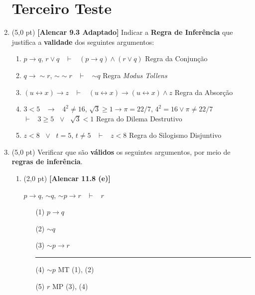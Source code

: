 \documentclass[12pt,a4paper,oneside]{article}
\begin{document}
\begin{enumerate}
	
	\section*{Terceiro Teste}
	
	\item (5,0 pt) {\bf [Alencar 9.3 Adaptado]} Indicar a {\bf Regra de Inferência} que justifica a {\bf validade} dos seguintes argumentos:
	\begin{enumerate}
		\item $p \rightarrow q$, $r \vee q$ \ $\vdash$ \ $(p \rightarrow q) \wedge (r \vee q)$ \hspace*{0.5cm} {\color{blue} Regra da Conjunção}
		\item $q \rightarrow \sim r$, $\sim \sim r$ \ $\vdash$ \ $\sim q$ \hspace*{0.5cm} {\color{blue} Regra {\it Modus Tollens}}
		\item $(u \leftrightarrow x) \rightarrow z$ \ $\vdash$ \ $(u \leftrightarrow x) \rightarrow (u \leftrightarrow x) \wedge z$ \hspace*{0.5cm} {\color{blue} Regra da Absorção}
		\item $3 < 5$ \ $\rightarrow$ \ $4^2 \not= 16$, $\sqrt{3} \geq 1 \rightarrow \pi = 22/7$, $4^2 = 16 \vee \pi \not= 22/7$ \ \\$\vdash$ \ $3 \geq 5$ \ $\vee$ \ $\sqrt{3} < 1$ \hspace*{0.5cm} {\color{blue} Regra do Dilema Destrutivo}
		\item $z < 8$ \ $\vee$ \ $t=5$, $t \not=5$ \ $\vdash$ \ $z <8$ \hspace*{0.5cm} {\color{blue} Regra do Silogismo Disjuntivo}
	\end{enumerate}
	
	\item (5,0 pt) Verificar que são {\bf válidos} os seguintes argumentos, por meio de {\bf regras de inferência}.
	\begin{enumerate}
		\item (2,0 pt) {\bf [Alencar 11.8 (e)]}
		\begin{center}
			$p \rightarrow q$, $\sim q$, $\sim p \rightarrow r$ \ $\vdash$ \ $r$
		\end{center}
		{\color{blue}
			\begin{itemize}
				\item[(1)] $p \rightarrow q$ 
				\item[(2)] $\sim q$
				\item[(3)] $\sim p \rightarrow r$ \\
				\rule{3cm}{0.5pt}
				\item[(4)] $\sim p$ \hspace*{0.7cm} MT (1), (2)
				\item[(5)] $r$ \hspace*{1.1cm} MP (3), (4)
			\end{itemize}
		}
		\vspace*{0.3cm}
		

\end{enumerate}
\end{enumerate}
\end{document}

